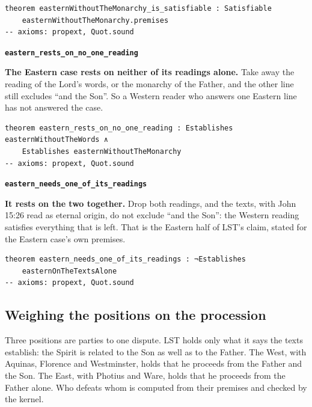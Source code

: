 \documentclass[11pt,paper=\testimonypaper,DIV=13,parskip=false]{scrartcl}
\begin{document}
{\small\begin{verbatim}
theorem easternWithoutTheMonarchy_is_satisfiable : Satisfiable
    easternWithoutTheMonarchy.premises
-- axioms: propext, Quot.sound
\end{verbatim}}
\par\medskip\noindent\textbf{\texttt{eastern\_\allowbreak{}rests\_\allowbreak{}on\_\allowbreak{}no\_\allowbreak{}one\_\allowbreak{}reading}}\par\nobreak\noindent
\textbf{The Eastern case rests on neither of its readings alone.} Take away the reading of the Lord’s words, or the monarchy of the Father, and the other line still excludes “and the Son”. So a Western reader who answers one Eastern line has not answered the case.

{\small\begin{verbatim}
theorem eastern_rests_on_no_one_reading : Establishes easternWithoutTheWords ∧
    Establishes easternWithoutTheMonarchy
-- axioms: propext, Quot.sound
\end{verbatim}}
\par\medskip\noindent\textbf{\texttt{eastern\_\allowbreak{}needs\_\allowbreak{}one\_\allowbreak{}of\_\allowbreak{}its\_\allowbreak{}readings}}\par\nobreak\noindent
\textbf{It rests on the two together.} Drop both readings, and the texts, with John 15:26 read as eternal origin, do not exclude “and the Son”: the Western reading satisfies everything that is left. That is the Eastern half of LST’s claim, stated for the Eastern case’s own premises.

{\small\begin{verbatim}
theorem eastern_needs_one_of_its_readings : ¬Establishes
    easternOnTheTextsAlone
-- axioms: propext, Quot.sound
\end{verbatim}}
\subsection*{Weighing the positions on the procession}
Three positions are parties to one dispute. LST holds only what it says the texts establish: the Spirit is related to the Son as well as to the Father. The West, with Aquinas, Florence and Westminster, holds that he proceeds from the Father and the Son. The East, with Photius and Ware, holds that he proceeds from the Father alone. Who defeats whom is computed from their premises and checked by the kernel.
\end{document}
